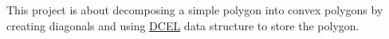 This project is about decomposing a simple polygon into convex polygons by creating diagonals and using \mbox{\hyperlink{class_d_c_e_l}{DCEL}} data structure to store the polygon. 